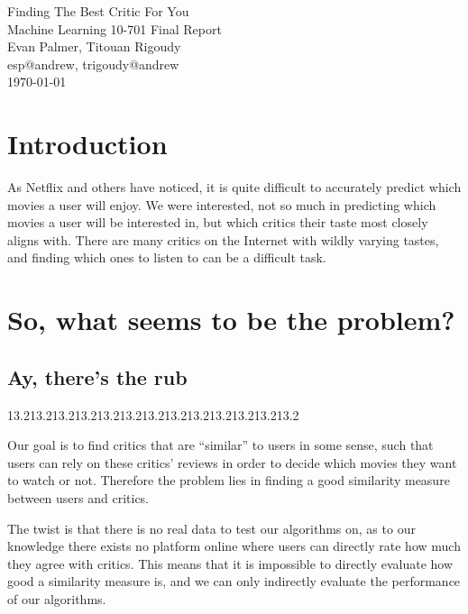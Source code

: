 \documentclass[12pt]{article}
\makeatletter
\newcommand{\myname}{Evan Palmer, Titouan Rigoudy}
\newcommand{\myandrew}{esp@andrew, trigoudy@andrew}
\newcommand{\thedate}{\today}
\newcommand{\matrixtesterror}{13.2}
\makeatother
\begin{document}
	\medskip    
	\thispagestyle{plain}
	\begin{center}                 
	{\LARGE Finding The Best Critic For You} \\
	\medskip
	Machine Learning 10-701 Final Report \\
	\smallskip
	\myname \\
	\myandrew \\
	\thedate \\
	\end{center}
	\vspace{0.5cm}

\section{Introduction}

As Netflix and others have noticed, it is quite difficult to accurately predict
which movies a user will enjoy. We were interested, not so much in predicting
which movies a user will be interested in, but which critics their taste most
closely aligns with. There are many critics on the Internet with wildly varying
tastes, and finding which ones to listen to can be a difficult task.



\section{So, what seems to be the problem?}

\subsection{Ay, there's the rub} %
						\matrixtesterror\matrixtesterror\matrixtesterror\matrixtesterror\matrixtesterror\matrixtesterror\matrixtesterror\matrixtesterror\matrixtesterror\matrixtesterror\matrixtesterror\matrixtesterror\matrixtesterror		 %

Our goal is to find critics that are ``similar'' to users in some sense, such
that users can rely on these critics' reviews in order to decide which movies
they want to watch or not. Therefore the problem lies in finding a good
similarity measure between users and critics.

The twist is that there is no real data to test our algorithms on, as to our
knowledge there exists no platform online where users can directly rate how
much they agree with critics. This means that it is impossible to directly
evaluate how good a similarity measure is, and we can only indirectly evaluate
the performance of our algorithms.
\end{document}
